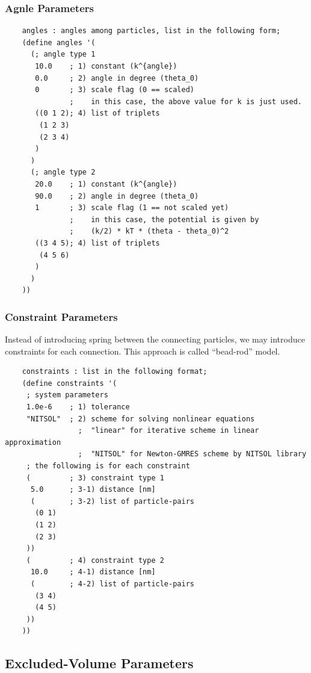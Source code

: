 \documentclass{book}
\begin{document}
\subsubsection{Agnle Parameters}
{\small
\begin{verbatim}
	angles : angles among particles, list in the following form;
	(define angles '(
	  (; angle type 1
	   10.0    ; 1) constant (k^{angle})
	   0.0     ; 2) angle in degree (theta_0)
	   0       ; 3) scale flag (0 == scaled)
	           ;    in this case, the above value for k is just used.
	   ((0 1 2); 4) list of triplets
	    (1 2 3)
	    (2 3 4)
	   )
	  )
	  (; angle type 2
	   20.0    ; 1) constant (k^{angle})
	   90.0    ; 2) angle in degree (theta_0)
	   1       ; 3) scale flag (1 == not scaled yet)
	           ;    in this case, the potential is given by
	           ;    (k/2) * kT * (theta - theta_0)^2
	   ((3 4 5); 4) list of triplets
	    (4 5 6)
	   )
	  )
	))
\end{verbatim}
}

\subsubsection{Constraint Parameters}
Instead of introducing spring between the connecting particles, 
we may introduce constraints for each connection. 
This approach is called ``bead-rod'' model. 

{\small
\begin{verbatim}
	constraints : list in the following format;
	(define constraints '(
	 ; system parameters
	 1.0e-6    ; 1) tolerance
	 "NITSOL"  ; 2) scheme for solving nonlinear equations
	             ;  "linear" for iterative scheme in linear approximation
	             ;  "NITSOL" for Newton-GMRES scheme by NITSOL library
	 ; the following is for each constraint
	 (         ; 3) constraint type 1
	  5.0      ; 3-1) distance [nm]
	  (        ; 3-2) list of particle-pairs
	   (0 1)
	   (1 2)
	   (2 3)
	 ))
	 (         ; 4) constraint type 2
	  10.0     ; 4-1) distance [nm]
	  (        ; 4-2) list of particle-pairs
	   (3 4)
	   (4 5)
	 ))
	))
\end{verbatim}
}

\subsection{Excluded-Volume Parameters}
\end{document}
